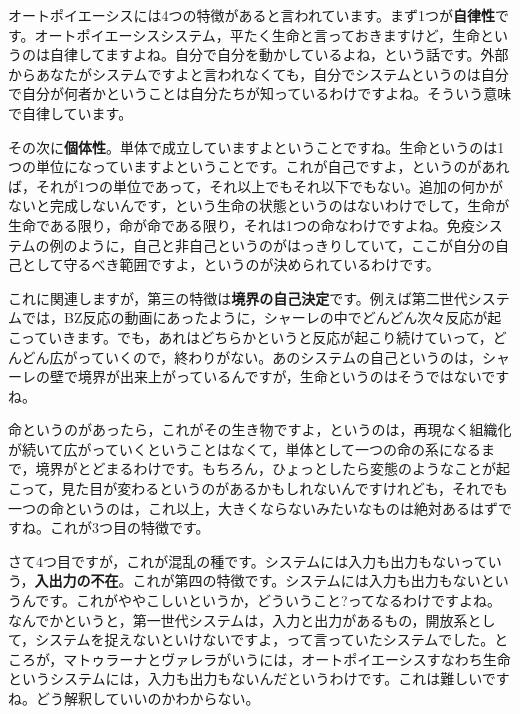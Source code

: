 \documentclass{ltjsbook}
\begin{document}
オートポイエーシスには4つの特徴があると言われています。まず1つが\textbf{自律性}です。オートポイエーシスシステム，平たく生命と言っておきますけど，生命というのは自律してますよね。自分で自分を動かしているよね，という話です。外部からあなたがシステムですよと言われなくても，自分でシステムというのは自分で自分が何者かということは自分たちが知っているわけですよね。そういう意味で自律しています。

その次に\textbf{個体性}。単体で成立していますよということですね。生命というのは1つの単位になっていますよということです。これが自己ですよ，というのがあれば，それが1つの単位であって，それ以上でもそれ以下でもない。追加の何かがないと完成しないんです，という生命の状態というのはないわけでして，生命が生命である限り，命が命である限り，それは1つの命なわけですよね。免疫システムの例のように，自己と非自己というのがはっきりしていて，ここが自分の自己として守るべき範囲ですよ，というのが決められているわけです。


これに関連しますが，第三の特徴は\textbf{境界の自己決定}です。例えば第二世代システムでは，BZ反応の動画にあったように，シャーレの中でどんどん次々反応が起こっていきます。でも，あれはどちらかというと反応が起こり続けていって，どんどん広がっていくので，終わりがない。あのシステムの自己というのは，シャーレの壁で境界が出来上がっているんですが，生命というのはそうではないですね。

命というのがあったら，これがその生き物ですよ，というのは，再現なく組織化が続いて広がっていくということはなくて，単体として一つの命の系になるまで，境界がとどまるわけです。もちろん，ひょっとしたら変態のようなことが起こって，見た目が変わるというのがあるかもしれないんですけれども，それでも一つの命というのは，これ以上，大きくならないみたいなものは絶対あるはずですね。これが3つ目の特徴です。

さて4つ目ですが，これが混乱の種です。システムには入力も出力もないっていう，\textbf{入出力の不在}。これが第四の特徴です。システムには入力も出力もないというんです。これがややこしいというか，どういうこと?ってなるわけですよね。なんでかというと，第一世代システムは，入力と出力があるもの，開放系として，システムを捉えないといけないですよ，って言っていたシステムでした。ところが，マトゥラーナとヴァレラがいうには，オートポイエーシスすなわち生命というシステムには，入力も出力もないんだというわけです。これは難しいですね。どう解釈していいのかわからない。
\end{document}
